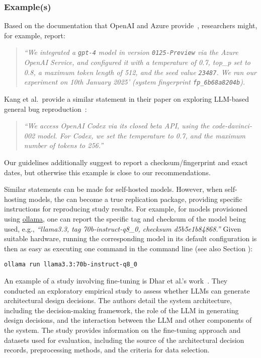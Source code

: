 \subsubsection{Example(s)}

Based on the documentation that OpenAI and Azure provide~\cite{OpenAI25, Azure25}, researchers might, for example, report:

\begin{quote}
\it
 ``We integrated a  \texttt{gpt-4} model in version \texttt{0125-Preview} via the Azure OpenAI Service, and configured it with a temperature of 0.7, top\_p set to 0.8, a maximum token length of 512, and the  seed value \texttt{23487}.
 We ran our experiment on 10th January 2025' (system fingerprint \texttt{fp\_6b68a8204b}).
\end{quote}

Kang et al.~provide a similar statement in their paper on exploring LLM-based general bug reproduction~\cite{DBLP:conf/icse/KangYY23}:

\begin{quote}
\it
``We access OpenAI Codex via its closed beta API, using the code-davinci-002 model. For Codex, we set the temperature to 0.7, and the maximum number of tokens to 256.''
\end{quote}

Our guidelines additionally suggest to report a checksum/fingerprint and exact dates, but otherwise this example is close to our recommendations. 

Similar statements can be made for self-hosted models.
However, when self-hosting models, the \supplementarymaterial can become a true replication package, providing specific instructions for reproducing study results.
For example, for models provisioned using \href{https://ollama.com/library/}{ollama}, one can report the specific tag and checksum of the model being used, e.g., \emph{``llama3.3, tag 70b-instruct-q8\_0, checksum d5b5e1b84868.''}
Given suitable hardware, running the corresponding model in its default configuration is then as easy as executing one command in the command line (see also Section \openllm):

\begin{verbatim}
ollama run llama3.3:70b-instruct-q8_0
\end{verbatim}

An example of a study involving fine-tuning is Dhar et al.'s work~\cite{DBLP:conf/icsa/DharVV24}.
They conducted an exploratory empirical study to assess whether LLMs can generate architectural design decisions. The authors detail the system architecture, including the decision-making framework, the role of the LLM in generating design decisions, and the interaction between the LLM and other components of the system. The study provides information on the fine-tuning approach and datasets used for evaluation, including the source of the architectural decision records, preprocessing methods, and the criteria for data selection. 


